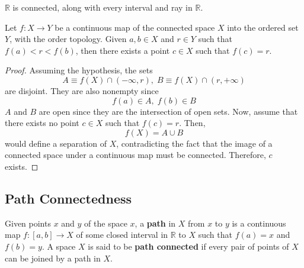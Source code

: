   \begin{corollary}
    $\mathbb{R}$ is connected, along with every interval and ray in $\mathbb{R}$. 
  \end{corollary}

  \begin{theorem}
    Let $f: X \longrightarrow Y$ be a continuous map of the connected space $X$ into the ordered set $Y$, with the order topology. Given $a, b \in X$ and $r \in Y$ such that $f(a)<r<f(b)$, then there exists a point $c \in X$ such that $f(c) = r$. 
  \end{theorem}
  \begin{proof}
    Assuming the hypothesis, the sets 
    \begin{equation}
      A \equiv f(X) \cap (-\infty, r), \; B \equiv f(X) \cap (r, +\infty)
    \end{equation}
    are disjoint. They are also nonempty since 
    \begin{equation}
      f(a) \in A, \; f(b) \in B
    \end{equation}
    $A$ and $B$ are open since they are the intersection of open sets. Now, assume that there exists no point $c \in X$ such that $f(c) = r$. Then, 
    \begin{equation}
      f(X) = A \cup B
    \end{equation}
    would define a separation of $X$, contradicting the fact that the image of a connected space under a continuous map must be connected. Therefore, $c$ exists. 
  \end{proof}

\subsection{Path Connectedness}

  \begin{definition}
    Given points $x$ and $y$ of the space $x$, a \textbf{path} in $X$ from $x$ to $y$ is a continuous map $f: [a,b] \longrightarrow X$ of some closed interval in $\mathbb{R}$ to $X$ such that $f(a) = x$ and $f(b)=y$. A space $X$ is said to be \textbf{path connected} if every pair of points of $X$ can be joined by a path in $X$. 
  \end{definition}

